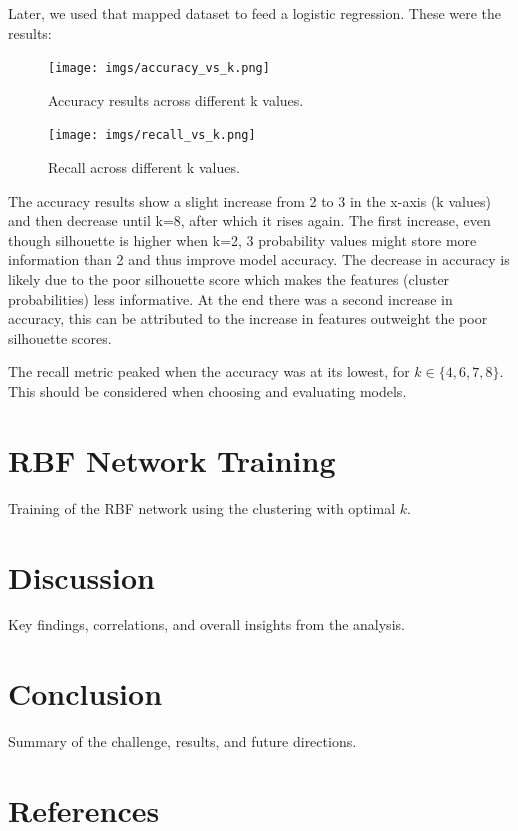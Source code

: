 \documentclass[a4paper,12pt]{article}
\begin{document}
Later, we used that mapped dataset to feed a logistic regression. These were the results:

\begin{figure}[H]
    \centering
    \begin{minipage}{0.48\textwidth}
        \centering
        \texttt{[image: imgs/accuracy\_vs\_k.png]}  %
        \caption{Accuracy results across different k values.}
        \label{fig:silhouette1}
    \end{minipage}
    \hfill
    \begin{minipage}{0.48\textwidth}
        \centering
        \texttt{[image: imgs/recall\_vs\_k.png]}  %
        \caption{Recall across different k values.}
        \label{fig:silhouette2}
    \end{minipage}
\end{figure}


The accuracy results show a slight increase from 2 to 3 in the x-axis (k values) and then decrease until k=8, after which it rises again. The first increase, even though silhouette is higher when k=2, 3 probability values might store more information than 2 and thus improve model accuracy. The decrease in accuracy is likely due to the poor silhouette score which makes the features (cluster probabilities) less informative. At the end there was a second increase in accuracy, this can be attributed to the increase in features outweight the poor silhouette scores.

The recall metric peaked when the accuracy was at its lowest, for \( k \in \{ 4, 6, 7, 8 \} \). This should be considered when choosing and evaluating models.



\section{RBF Network Training}
\label{sec:rbf-network}
Training of the RBF network using the clustering with optimal \(k\).

\section{Discussion}
\label{sec:discussion}
Key findings, correlations, and overall insights from the analysis.

\section{Conclusion}
\label{sec:conclusion}
Summary of the challenge, results, and future directions.

\section*{References}
\label{sec:references}
\end{document}
